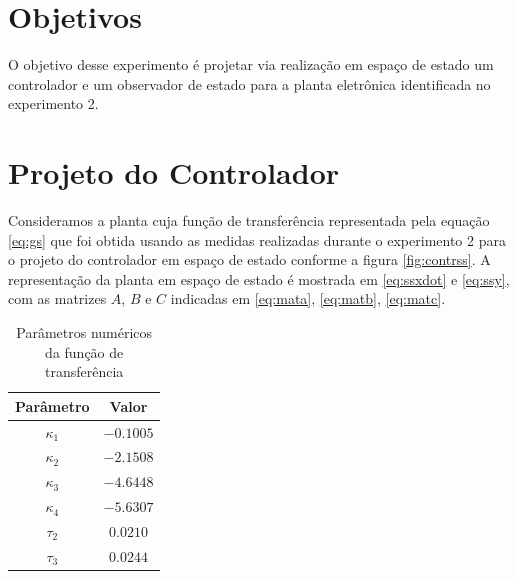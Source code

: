 \documentclass{article}
\begin{document}


\onehalfspacing
\section{Objetivos} 
O objetivo desse experimento é projetar via realização em espaço de estado um controlador e um observador de estado para a planta eletrônica identificada no experimento 2\cite{bb:lab2}. 
	
\section{Projeto do Controlador}
Consideramos a planta cuja função de transferência representada pela equação \ref{eq:gs} que foi obtida usando as medidas realizadas durante o experimento 2\cite{bb:lab2} para o projeto do controlador em espaço de estado conforme a figura \ref{fig:contrss}. A representação da planta em espaço de estado é mostrada em \ref{eq:ssxdot} e \ref{eq:ssy}, com as matrizes $A$, $B$ e $C$ indicadas em \ref{eq:mata}, 
\ref{eq:matb}, \ref{eq:matc}.\\

\begin{table}[H]
	\centering
	\caption{Parâmetros numéricos da função de transferência}
	\label{tab:valores}
	\begin{tabular}{|c|c|}
		\hline Parâmetro & Valor \\ 
		\hline $\kappa_1$ & $-0.1005$\\ 
		\hline $\kappa_2$ & $-2.1508$\\ 
		\hline $\kappa_3$ & $-4.6448$\\ 
		\hline $\kappa_4$ & $-5.6307$\\ 
		\hline $\tau_2$ & $0.0210$\\ 
		\hline $\tau_3$ & $0.0244$ \\ 	
		\hline 
	\end{tabular} 
\end{table}
\end{document}
